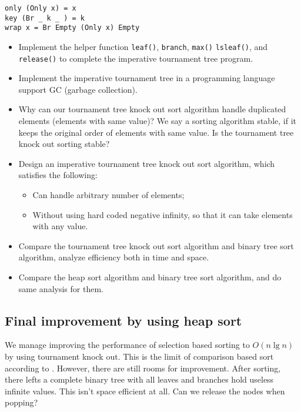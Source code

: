 \documentclass[UTF8]{article}
\begin{document}
\lstset{language=Haskell}
\begin{lstlisting}
only (Only x) = x
key (Br _ k _ ) = k
wrap x = Br Empty (Only x) Empty
\end{lstlisting}

\begin{Exercise}
  \begin{itemize}
    \item Implement the helper function \verb|leaf()|, \verb|branch|, \verb|max()| \verb|lsleaf()|, and \verb|release()| to complete the imperative tournament tree program.
    \item Implement the imperative tournament tree in a programming language support GC (garbage collection).
    \item Why can our tournament tree knock out sort algorithm handle duplicated elements (elements with same value)? We say a sorting algorithm stable, if it keeps the original order of elements with same value. Is the tournament tree knock out sorting stable?
    \item Design an imperative tournament tree knock out sort algorithm, which satisfies the following:
      \begin{itemize}
        \item Can handle arbitrary number of elements;
        \item Without using hard coded negative infinity, so that it can take elements with any value.
      \end{itemize}
    \item Compare the tournament tree knock out sort algorithm and binary tree sort algorithm, analyze efficiency both in time and space.
    \item Compare the heap sort algorithm and binary tree sort algorithm, and do same analysis for them.
  \end{itemize}
\end{Exercise}

\subsection{Final improvement by using heap sort}

We manage improving the performance of selection based sorting to $O(n \lg n)$ by using tournament knock out.
This is the limit of comparison based sort according to \cite{TAOCP}. However, there are still rooms for improvement.
After sorting, there lefts a complete binary tree with all leaves and branches hold useless infinite values.
This isn't space efficient at all. Can we release the nodes when popping?
\end{document}
